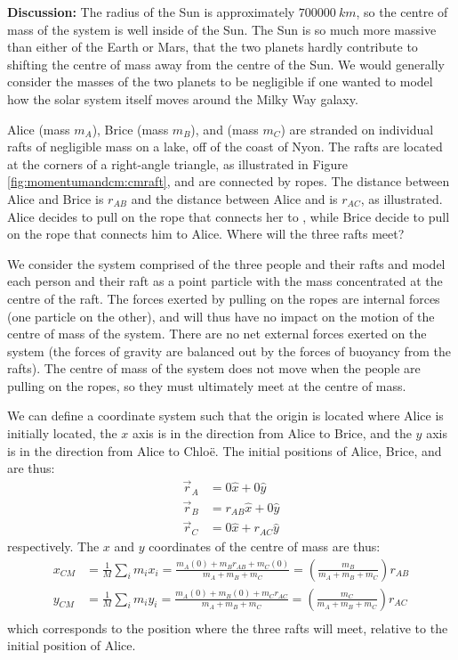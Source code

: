 \begin{example}
\textbf{Discussion:} The radius of the Sun is approximately $\SI{700000}{km}$, so the centre of mass of the system is well inside of the Sun. The Sun is so much more massive than either of the Earth or Mars, that the two planets hardly contribute to shifting the centre of mass away from the centre of the Sun. We would generally consider the masses of the two planets to be negligible if one wanted to model how the solar system itself moves around the Milky Way galaxy.
\end{example}
\vspace{-0.25cm}
\begin{example}{
Alice (mass $m_A$), Brice (mass $m_B$), and \chloe (mass $m_C$) are stranded on individual rafts of negligible mass on a lake, off of the coast of Nyon. The rafts are located at the corners of a right-angle triangle, as illustrated in Figure \ref{fig:momentumandcm:cmraft}, and are connected by ropes. The distance between Alice and Brice is $r_{AB}$ and the distance between Alice and \chloe is $r_{AC}$, as illustrated. Alice decides to pull on the rope that connects her to \chloe, while Brice decide to pull on the rope that connects him to Alice. Where will the three rafts meet?}

We consider the system comprised of the three people and their rafts and model each person and their raft as a point particle with the mass concentrated at the centre of the raft. The forces exerted by pulling on the ropes are internal forces (one particle on the other), and will thus have no impact on the motion of the centre of mass of the system. There are no net external forces exerted on the system (the forces of gravity are balanced out by the forces of buoyancy from the rafts). The centre of mass of the system does not move when the people are pulling on the ropes, so they must ultimately meet at the centre of mass.

We can define a coordinate system such that the origin is located where Alice is initially located, the $x$ axis is in the direction from Alice to Brice, and the $y$ axis is in the direction from Alice to Chlo\"e. The initial positions of Alice, Brice, and \chloe are thus:
\begin{align*}
\vec r_A &= 0\hat x + 0\hat y\\
\vec r_B &= r_{AB}\hat x + 0\hat y\\
\vec r_C &= 0\hat x + r_{AC}\hat y
\end{align*}
respectively. The $x$ and $y$ coordinates of the centre of mass are thus:
\begin{align*}
x_{CM} &= \frac{1}{M}\sum_i m_i x_i = \frac{m_A(0) + m_Br_{AB} + m_C(0)}{m_A + m_B + m_C}=\left(\frac{m_B}{m_A + m_B + m_C}\right)r_{AB}\\
y_{CM} &= \frac{1}{M}\sum_i m_i y_i = \frac{m_A(0) + m_B(0) + m_Cr_{AC}}{m_A + m_B + m_C}=\left(\frac{m_C}{m_A + m_B + m_C}\right)r_{AC}\\
\end{align*}
which corresponds to the position where the three rafts will meet, relative to the initial position of Alice.


\end{example}
